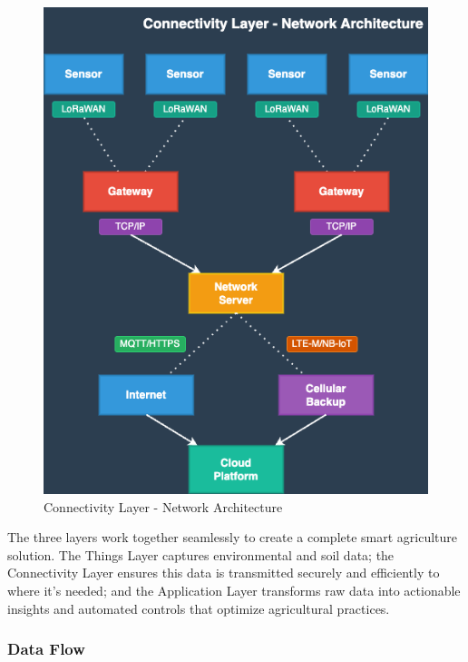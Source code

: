 \documentclass[12pt,a4paper]{article}
\begin{document}
\begin{figure}[H]
\centering
\includegraphics[width=\textwidth]{img/drawio/Connectivity_Layer.png}
\caption{Connectivity Layer - Network Architecture}
\label{fig:connectivity_layer}
\end{figure}

The three layers work together seamlessly to create a complete smart agriculture solution. The Things Layer captures environmental and soil data; the Connectivity Layer ensures this data is transmitted securely and efficiently to where it's needed; and the Application Layer transforms raw data into actionable insights and automated controls that optimize agricultural practices.

\subsubsection{Data Flow}
\end{document}
